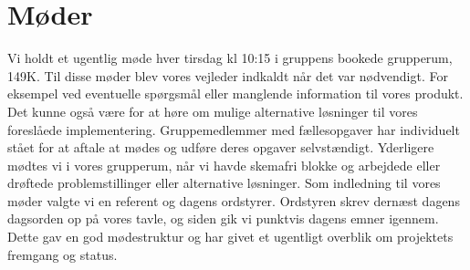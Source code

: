 \section{Møder}

Vi holdt et ugentlig møde hver tirsdag kl 10:15 i gruppens bookede grupperum, 149K. Til disse møder blev vores vejleder indkaldt når det var nødvendigt. For eksempel ved eventuelle spørgsmål eller manglende information til vores produkt. Det kunne også være for at høre om mulige alternative løsninger til vores foreslåede implementering. 
Gruppemedlemmer med fællesopgaver har individuelt stået for at aftale at mødes og udføre deres opgaver selvstændigt.
Yderligere mødtes vi i vores grupperum, når vi havde skemafri blokke og arbejdede eller drøftede problemstillinger eller alternative løsninger. 
Som indledning til vores møder valgte vi en referent og dagens ordstyrer. Ordstyren skrev dernæst dagens dagsorden op på vores tavle, og siden gik vi punktvis dagens emner igennem. Dette gav en god mødestruktur og har givet et ugentligt overblik om projektets fremgang og status.